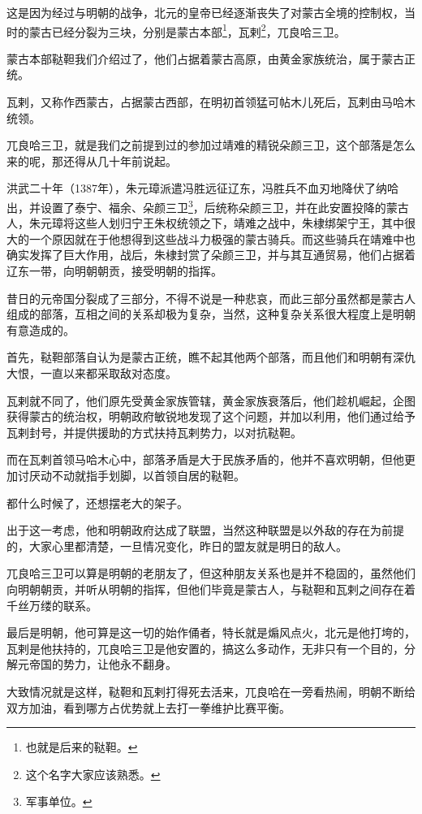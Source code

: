 \begin{multicols}{\theparacolNo}
这是因为经过与明朝的战争，北元的皇帝已经逐渐丧失了对蒙古全境的控制权，当时的蒙古已经分裂为三块，分别是蒙古本部\footnote{也就是后来的鞑靼。}，瓦剌\footnote{这个名字大家应该熟悉。}，兀良哈三卫。

蒙古本部鞑靼我们介绍过了，他们占据着蒙古高原，由黄金家族统治，属于蒙古正统。

瓦剌，又称作西蒙古，占据蒙古西部，在明初首领猛可帖木儿死后，瓦剌由马哈木统领。

兀良哈三卫，就是我们之前提到过的参加过靖难的精锐朵颜三卫，这个部落是怎么来的呢，那还得从几十年前说起。

洪武二十年（1387年），朱元璋派遣冯胜远征辽东，冯胜兵不血刃地降伏了纳哈出，并设置了泰宁、福余、朵颜三卫\footnote{军事单位。}，后统称朵颜三卫，并在此安置投降的蒙古人，朱元璋将这些人划归宁王朱权统领之下，靖难之战中，朱棣绑架宁王，其中很大的一个原因就在于他想得到这些战斗力极强的蒙古骑兵。而这些骑兵在靖难中也确实发挥了巨大作用，战后，朱棣封赏了朵颜三卫，并与其互通贸易，他们占据着辽东一带，向明朝朝贡，接受明朝的指挥。

昔日的元帝国分裂成了三部分，不得不说是一种悲哀，而此三部分虽然都是蒙古人组成的部落，互相之间的关系却极为复杂，当然，这种复杂关系很大程度上是明朝有意造成的。

首先，鞑靼部落自认为是蒙古正统，瞧不起其他两个部落，而且他们和明朝有深仇大恨，一直以来都采取敌对态度。

瓦剌就不同了，他们原先受黄金家族管辖，黄金家族衰落后，他们趁机崛起，企图获得蒙古的统治权，明朝政府敏锐地发现了这个问题，并加以利用，他们通过给予瓦剌封号，并提供援助的方式扶持瓦剌势力，以对抗鞑靼。

而在瓦剌首领马哈木心中，部落矛盾是大于民族矛盾的，他并不喜欢明朝，但他更加讨厌动不动就指手划脚，以首领自居的鞑靼。

都什么时候了，还想摆老大的架子。

出于这一考虑，他和明朝政府达成了联盟，当然这种联盟是以外敌的存在为前提的，大家心里都清楚，一旦情况变化，昨日的盟友就是明日的敌人。

兀良哈三卫可以算是明朝的老朋友了，但这种朋友关系也是并不稳固的，虽然他们向明朝朝贡，并听从明朝的指挥，但他们毕竟是蒙古人，与鞑靼和瓦剌之间存在着千丝万缕的联系。

最后是明朝，他可算是这一切的始作俑者，特长就是煽风点火，北元是他打垮的，瓦剌是他扶持的，兀良哈三卫是他安置的，搞这么多动作，无非只有一个目的，分解元帝国的势力，让他永不翻身。

大致情况就是这样，鞑靼和瓦剌打得死去活来，兀良哈在一旁看热闹，明朝不断给双方加油，看到哪方占优势就上去打一拳维护比赛平衡。


\end{multicols}
